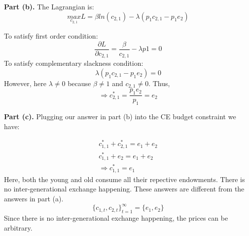 \documentclass[letterpaper,12pt]{article}
\theoremstyle{definition}
\begin{document}
\textbf{Part (b).} The Lagrangian is:
\begin{equation*}
	\underset{c_{2,1}}{max}
   L= \beta ln(c_{2,1})-\lambda (p_1 c_{2,1} - p_1 e_2)
\end{equation*}

To satisfy first order condition:
\begin{equation*} 
\frac{\partial L}{\partial c_{2,1}} = \frac{\beta}{c_{2,1}}-\lambda p1 = 0
\end{equation*}
To satisfy complementary slackness condition:
\begin{equation*}
\lambda (p_1 c_{2,1}-p_1 e_2) = 0
\end {equation*}
However, here $\lambda \neq 0$ because $\beta \neq 1$ and $c_{2,1} \neq 0$. Thus,
\begin{equation*} 
\Rightarrow c_{2,1}^*=\frac{p_1 e_2}{p_1} = e_2
\end{equation*}

\textbf{Part (c).}  Plugging our answer in part (b) into the CE budget constraint we have:

\begin{align*}
c_{1,1}^*+c_{2,1}^*=e_1+e_2\\
c_{1,1}^*+e_2=e_1+e_2\\
\Rightarrow c_{1,1}^*=e_1
\end{align*}
Here, both the young and old consume all their repective endowments. There is no inter-generational exchange happening. These answers are different from the answers in part (a).
\begin{equation*}
\{c_{1,t},c_{2,t}\}_{t=1}^\infty = \{e_1,e_2\}
\end{equation*}
Since there is no inter-generational exchange happening, the prices can be arbitrary. 
\end{document}
